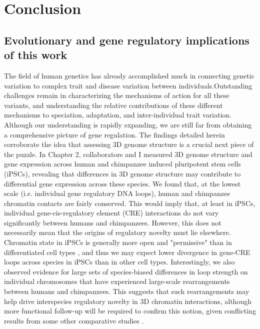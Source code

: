 \chapter{Conclusion}\label{conclusion}

\section{Evolutionary and gene regulatory implications of this work}
The field of human genetics has already accomplished much in connecting genetic variation to complex trait and disease variation between individuals.Outstanding challenges remain in characterizing the mechanisms of action for all these variants, and understanding the relative contributions of these different mechanisms to speciation, adaptation, and inter-individual trait variation. Although our understanding is rapidly expanding, we are still far from obtaining a comprehensive picture of gene regulation. The findings detailed herein corroborate the idea that assessing 3D genome structure is a crucial next piece of the puzzle. In Chapter 2, collaborators and I measured 3D genome structure and gene expression across human and chimpanzee induced pluripotent stem cells (iPSCs), revealing that differences in 3D genome structure may contribute to differential gene expression across these species. We found that, at the lowest scale (i.e. individual gene regulatory DNA loops), human and chimpanzee chromatin contacts are fairly conserved. This would imply that, at least in iPSCs, individual gene-cis-regulatory element (CRE) interactions do not vary significantly between humans and chimpanzees. However, this does not necessarily mean that the origins of regulatory novelty must lie elsewhere. Chromatin state in iPSCs is generally more open and "permissive" than in differentiated cell types \cite{Spivakov.2007}, and thus we may expect lower divergence in gene-CRE loops across species in iPSCs than in other cell types. Interestingly, we also observed evidence for large sets of species-biased differences in loop strength on individual chromosomes that have experienced large-scale rearrangements between humans and chimpanzees. This suggests that such rearrangements may help drive interspecies regulatory novelty in 3D chromatin interactions, although more functional follow-up will be required to confirm this notion, given conflicting results from some other comparative studies \cite{Lazar.2018, Krefting.2018}.

